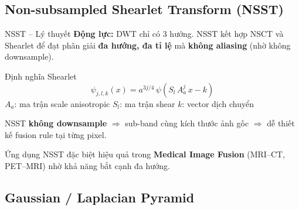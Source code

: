 \documentclass{beamer}
\begin{document}
\subsection{Non-subsampled Shearlet Transform (NSST)}

\begin{frame}{NSST -- Lý thuyết}
    \small
    \textbf{Động lực:} DWT chỉ có 3 hướng. NSST kết hợp NSCT và Shearlet để đạt phân giải \textbf{đa hướng, đa tỉ lệ} mà \textbf{không aliasing} (nhờ không downsample).

    \vspace{0.15cm}
    \begin{block}{Định nghĩa Shearlet}
        \vspace{-0.2cm}
        \begin{equation}
            \psi_{j,l,k}(x) = a^{3j/4}\, \psi\!\left(S_l\, A_a^j\, x - k\right)
        \end{equation}
        \vspace{-0.2cm}
        \footnotesize $A_a$: ma trận scale anisotropic \quad $S_l$: ma trận shear \quad $k$: vector dịch chuyển
    \end{block}

    \vspace{0.1cm}
    NSST \textbf{không downsample} $\Rightarrow$ sub-band cùng kích thước ảnh gốc $\Rightarrow$ dễ thiết kế fusion rule tại từng pixel.

    \vspace{0.1cm}
    \begin{exampleblock}{Ứng dụng}
        \footnotesize NSST đặc biệt hiệu quả trong \textbf{Medical Image Fusion} (MRI--CT, PET--MRI) nhờ khả năng bắt cạnh đa hướng.
    \end{exampleblock}
\end{frame}

\subsection{Gaussian / Laplacian Pyramid}
\end{document}
